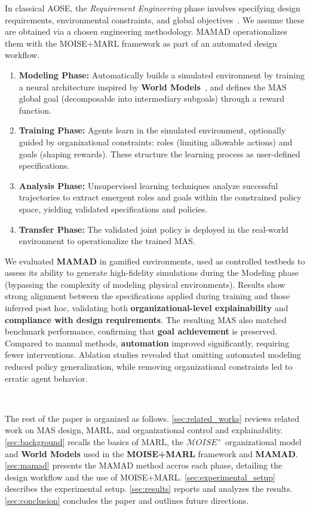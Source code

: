 \documentclass[pdflatex,sn-mathphys-num]{sn-jnl}%
\theoremstyle{thmstyleone}%
\theoremstyle{thmstyletwo}%
\theoremstyle{thmstylethree}%
\begin{document}
In classical AOSE, the \textit{Requirement Engineering} phase involves specifying design requirements, environmental constraints, and global objectives~\cite{Pavon2003, Bernon2005}. We assume these are obtained via a chosen engineering methodology. MAMAD operationalizes them with the MOISE+MARL framework as part of an automated design workflow.

\begin{enumerate}
    \item \textbf{Modeling Phase:} Automatically builds a simulated environment by training a neural architecture inspired by \textbf{World Models}~\cite{Ha2018}, and defines the MAS global goal (decomposable into intermediary subgoals) through a reward function.
    \item \textbf{Training Phase:} Agents learn in the simulated environment, optionally guided by organizational constraints: roles (limiting allowable actions) and goals (shaping rewards). These structure the learning process as user-defined specifications.
    \item \textbf{Analysis Phase:} Unsupervised learning techniques analyze successful trajectories to extract emergent roles and goals within the constrained policy space, yielding validated specifications and policies.
    \item \textbf{Transfer Phase:} The validated joint policy is deployed in the real-world environment to operationalize the trained MAS.
\end{enumerate}

We evaluated \textbf{MAMAD} in gamified environments, used as controlled testbeds to assess its ability to generate high-fidelity simulations during the Modeling phase (bypassing the complexity of modeling physical environments). Results show strong alignment between the specifications applied during training and those inferred post hoc, validating both \textbf{organizational-level explainability} and \textbf{compliance with design requirements}. The resulting MAS also matched benchmark performance, confirming that \textbf{goal achievement} is preserved. Compared to manual methods, \textbf{automation} improved significantly, requiring fewer interventions. Ablation studies revealed that omitting automated modeling reduced policy generalization, while removing organizational constraints led to erratic agent behavior.

\

The rest of the paper is organized as follows. \autoref{sec:related_works} reviews related work on MAS design, MARL, and organizational control and explainability. \autoref{sec:background} recalls the basics of MARL, the $\mathcal{M}OISE^+$ organizational model and \textbf{World Models} used in the \textbf{MOISE+MARL} framework and \textbf{MAMAD}. \autoref{sec:mamad} presents the MAMAD method accros each phase, detailing the design workflow and the use of MOISE+MARL. \autoref{sec:experimental_setup} describes the experimental setup. \autoref{sec:results} reports and analyzes the results. \autoref{sec:conclusion} concludes the paper and outlines future directions.
\end{document}
